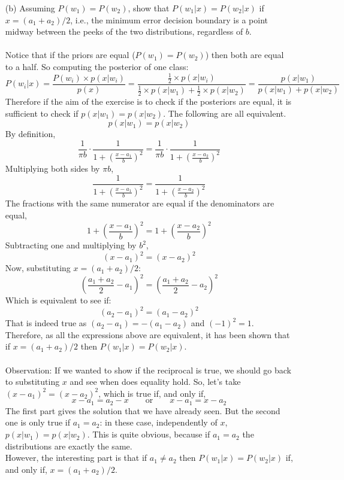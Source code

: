 \documentclass[10pt]{article}
\begin{document}
\begin{enumerate}
\Large
  \item[(b)] Assuming $P(w_1)=P(w_2)$, show that $P(w_1|x)=P(w_2|x)$ if $x=(a_1 + a_2)/2$, i.e., the minimum error decision boundary is a point midway between the peeks of the two distributions, regardless of $b$. \\ \ \\
\normalsize
Notice that if the priors are equal ($P(w_1)=P(w_2)$) then both are equal to a half. So computing the posterior of one class:
$$
P(w_i|x) = \frac{P(w_i)\times p(x|w_i)}{p(x)} = \frac{\frac{1}{2}\times p(x|w_i)}{\frac{1}{2}\times p(x|w_1) + \frac{1}{2}\times p(x|w_2)} = \frac{ p(x|w_1)}{ p(x|w_1) + p(x|w_2)}
$$
Therefore if the aim of the exercise is to check if the posteriors are equal, it is sufficient to check if $p(x|w_1)=p(x|w_2)$. The following are all equivalent.
$$
p(x|w_1)=p(x|w_2)
$$
By definition,
$$
\frac{1}{\pi b} \cdot \frac{1}{1 + \left(\frac{x-a_1}{b}\right)^2}=\frac{1}{\pi b} \cdot \frac{1}{1 + \left(\frac{x-a_2}{b}\right)^2}
$$
Multiplying both sides by $\pi b$,
$$
\frac{1}{1 + \left(\frac{x-a_1}{b}\right)^2}= \frac{1}{1 + \left(\frac{x-a_2}{b}\right)^2}
$$
The fractions with the same numerator are equal if the denominators are equal,
$$
1 + \left(\frac{x-a_1}{b}\right)^2= 1 + \left(\frac{x-a_2}{b}\right)^2
$$
Subtracting one and multiplying by $b^2$,
$$
(x-a_1)^2=(x-a_2)^2
$$
Now, substituting $x=(a_1 + a_2)/2$:
$$
\left(\frac{a_1+a_2}{2}-a_1\right)^2=\left(\frac{a_1+a_2}{2}-a_2\right)^2
$$
Which is equivalent to see if:
$$
(a_2-a_1)^2=(a_1-a_2)^2
$$
That is indeed true as $(a_2-a_1)=-(a_1-a_2)$ and $(-1)^2=1$. Therefore, as all the expressions above are equivalent, it has been shown that if $x=(a_1+a_2)/2$ then $P(w_1|x)=P(w_2|x)$. \\ \ \\
\color{blue}Observation: \color{black} If we wanted to show if the reciprocal is true, we should go back to substituting $x$ and see when does equality hold. So, let's take $(x-a_1)^2=(x-a_2)^2$, which is true if, and only if,
$$
x-a_1=a_2-x \qquad \text{or} \qquad x-a_1 = x-a_2
$$
The first part gives the solution that we have already seen. But the second one is only true if $a_1=a_2$: in these case, independently of $x$, $p(x|w_1)=p(x|w_2)$. This is quite obvious, because if $a_1=a_2$ the distributions are exactly the same. \\

However, the interesting part is that if $a_1 \neq a_2$ then $P(w_1|x)=P(w_2|x)$ if, and only if, $x=(a_1+a_2)/2$.


\end{enumerate}
\end{document}
